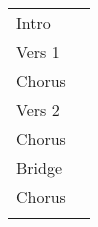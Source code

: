 
\begin{tabular}{ll}
	Intro  &  \\
	Vers 1 &  \\
	Chorus &  \\
	Vers 2 &  \\
	Chorus &  \\
	Bridge &  \\
	Chorus &  \\
	& \\
\end{tabular}